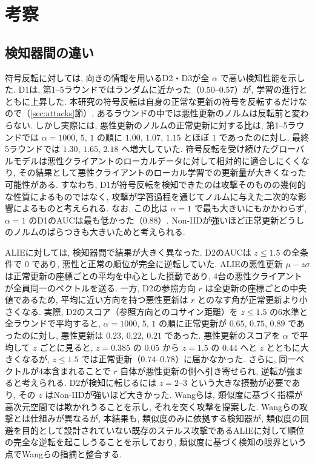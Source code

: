\documentclass[a4j, twocolumn, dvipdfmx]{jsarticle}
\begin{document}
\section{考察}
\label{sec:discussion}

\subsection{検知器間の違い}
\label{sec:disc-detectors}

符号反転に対しては, 向きの情報を用いるD2・D3が全 $\alpha$ で高い検知性能を示した. D1は, 第1--5ラウンドではランダムに近かった（$0.50$--$0.57$）が, 学習の進行とともに上昇した. 本研究の符号反転は自身の正常な更新の符号を反転するだけなので（\ref{sec:attacks}節）, あるラウンドの中では悪性更新のノルムは反転前と変わらない. しかし実際には, 悪性更新のノルムの正常更新に対する比は, 第1--5ラウンドでは $\alpha=1000,\,5,\,1$ の順に $1.00$, $1.07$, $1.15$ とほぼ $1$ であったのに対し, 最終5ラウンドでは $1.30$, $1.65$, $2.18$ へ増大していた. 符号反転を受け続けたグローバルモデルは悪性クライアントのローカルデータに対して相対的に適合しにくくなり, その結果として悪性クライアントのローカル学習での更新量が大きくなった可能性がある. すなわち, D1が符号反転を検知できたのは攻撃そのものの幾何的な性質によるものではなく, 攻撃が学習過程を通じてノルムに与えた二次的な影響によるものと考えられる. なお, この比は $\alpha=1$ で最も大きいにもかかわらず, $\alpha=1$ のD1のAUCは最も低かった（$0.88$）. Non-IIDが強いほど正常更新どうしのノルムのばらつきも大きいためと考えられる.

ALIEに対しては, 検知器間で結果が大きく異なった. D2のAUCは $z \le 1.5$ の全条件で $0$ であり, 悪性と正常の順位が完全に逆転していた. ALIEの悪性更新 $\mu - z\sigma$ は正常更新の座標ごとの平均を中心とした摂動であり, 4台の悪性クライアントが全員同一のベクトルを送る. 一方, D2の参照方向 $r$ は全更新の座標ごとの中央値であるため, 平均に近い方向を持つ悪性更新は $r$ とのなす角が正常更新より小さくなる. 実際, D2のスコア（参照方向とのコサイン距離）を $z \le 1.5$ の6水準と全ラウンドで平均すると, $\alpha=1000,\,5,\,1$ の順に正常更新が $0.65$, $0.75$, $0.89$ であったのに対し, 悪性更新は $0.23$, $0.22$, $0.21$ であった. 悪性更新のスコアを $\alpha$ で平均して $z$ ごとに見ると, $z=0.385$ の $0.05$ から $z=1.5$ の $0.44$ へと $z$ とともに大きくなるが, $z \le 1.5$ では正常更新（$0.74$--$0.78$）に届かなかった. さらに, 同一ベクトルが4本含まれることで $r$ 自体が悪性更新の側へ引き寄せられ, 逆転が強まると考えられる. D2が検知に転じるには $z=2$--$3$ という大きな摂動が必要であり, その $z$ はNon-IIDが強いほど大きかった. Wangら\cite{wang2023trust}は, 類似度に基づく指標が高次元空間では欺かれうることを示し, それを突く攻撃を提案した. Wangらの攻撃とは仕組みが異なるが, 本結果も, 類似度のみに依拠する検知器が, 類似度の回避を目的として設計されていない既存のステルス攻撃であるALIEに対して順位の完全な逆転を起こしうることを示しており, 類似度に基づく検知の限界という点でWangらの指摘と整合する.
\end{document}
